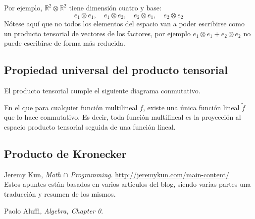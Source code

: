 \documentclass[paper=a4, fontsize=11pt, spanish]{scrartcl}
\numberwithin{equation}{section} %
\numberwithin{figure}{section} %
\numberwithin{table}{section} %
\begin{document}
    Por ejemplo, $\mathbb{R}^2\otimes\mathbb{R}^2$ tiene dimensión cuatro y base:
    $$ e_1\otimes e_1,\quad e_1\otimes e_2,\quad  e_2 \otimes e_1,\quad  e_2 \otimes e_2 $$
    Nótese aquí que no todos los elementos del espacio van a poder escribirse como un producto tensorial
    de vectores de los factores, por ejemplo $e_1 \otimes e_1 + e_2 \otimes e_2$ no puede escribirse de forma
    más reducida. %
    
  \subsection{Propiedad universal del producto tensorial}
    El producto tensorial cumple el siguiente diagrama conmutativo.
    \begin{center}
      \end{center}
    En el que para cualquier función multilineal $f$, existe una única función
    lineal $\tilde f$ que lo hace conmutativo. Es decir, toda función multilineal es la proyección 
    al espacio producto tensorial seguida de una función lineal.
    
  \subsection{Producto de Kronecker}
    
    
  \vfill
  \begin{thebibliography}{9}

    Jeremy Kun,
    \emph{Math $\cap$ Programming}. \quad
    \url{http://jeremykun.com/main-content/} \\
    Estos apuntes están basados en varios artículos del blog, siendo 
    varias partes una traducción y resumen de los mismos.
    
    Paolo Aluffi,
    \emph{Algebra, Chapter 0}. \\
    
  \end{thebibliography}
\end{document}

